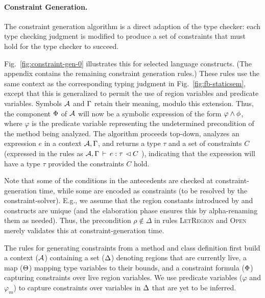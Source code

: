 

\paragraph{Constraint Generation.}
The constraint generation algorithm is a direct adaption of the type checker:
each type checking judgment is modified to produce a set of constraints that must hold
for the type checker to succeed.

Fig.~\ref{fig:constraint-gen-0} illustrates this for selected language constructs.
(The appendix contains the remaining constraint generation rules.)
These rules use the same context as the corresponding typing judgment in
Fig.~\ref{fig:fb-staticsem}, except that this is generalized to permit the
use of region variables and predicate variables.
Symbols ${\mathcal{A}}$ and $\Gamma$ retain their meaning, modulo this extension.
Thus, the component $\Phi$ of ${\mathcal{A}}$ will now be a symbolic expression
of the form $\varphi \wedge \phi$, where $\varphi$ is the predicate variable
representing the undetermined precondition of the method being analyzed.
The algorithm proceeds top-down, analyzes an expression $e$ in a context
${\mathcal{A}},\Gamma$, and returns a type $\tau$ and a set of constraints $C$
(expressed in the rules as ${{\mathcal{A}},\Gamma} \, \vdash \, {e} : {\tau} \, \lhd {C}$ ),
indicating that the expression will have a type $\tau$ provided the constraints $C$ hold.

Note that some of the conditions in the antecedents are checked at constraint-generation
time, while some are encoded as constraints (to be resolved by the constraint-solver).
E.g., we assume that the region constants introduced by
and
constructs are unique (and the elaboration phase ensures this by alpha-renaming
them as needed). Thus, the precondition $\rho \not\in \Delta$ in rules \textsc{LetRegion}
and \textsc{Open} merely validates this at constraint-generation time.

The rules for generating constraints from a method and
class definition first build a context (${\mathcal{A}}$) containing a set ($ \Delta$) denoting
regions that are currently live, a map ($\Theta$) mapping type
variables to their bounds, and a constraint formula ($\Phi$)
capturing constraints over live region variables. We use predicate
variables ($\varphi$ and $\varphi_m$) to capture constraints over
variables in $\Delta$ that are yet to be inferred.

